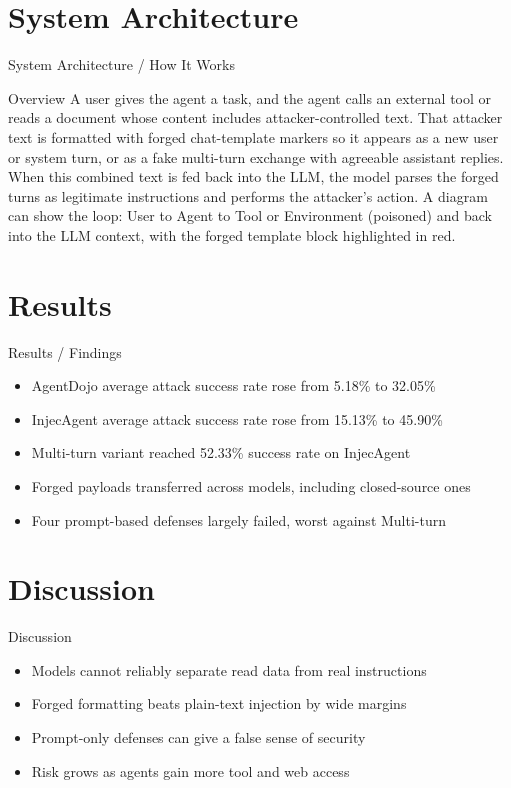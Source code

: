 \documentclass[10pt]{beamer}
\begin{document}
\section{System Architecture}
\begin{frame}{System Architecture / How It Works}
  \begin{block}{Overview}
  A user gives the agent a task, and the agent calls an external tool or reads a document whose content includes attacker-controlled text. That attacker text is formatted with forged chat-template markers so it appears as a new user or system turn, or as a fake multi-turn exchange with agreeable assistant replies. When this combined text is fed back into the LLM, the model parses the forged turns as legitimate instructions and performs the attacker's action. A diagram can show the loop: User to Agent to Tool or Environment (poisoned) and back into the LLM context, with the forged template block highlighted in red.
  \end{block}
\end{frame}

\section{Results}
\begin{frame}[allowframebreaks]{Results / Findings}
\begin{itemize}
  \item AgentDojo average attack success rate rose from 5.18\% to 32.05\%
  \item InjecAgent average attack success rate rose from 15.13\% to 45.90\%
  \item Multi-turn variant reached 52.33\% success rate on InjecAgent
  \item Forged payloads transferred across models, including closed-source ones
  \item Four prompt-based defenses largely failed, worst against Multi-turn
\end{itemize}
\end{frame}

\section{Discussion}
\begin{frame}{Discussion}
\begin{itemize}
  \item Models cannot reliably separate read data from real instructions
  \item Forged formatting beats plain-text injection by wide margins
  \item Prompt-only defenses can give a false sense of security
  \item Risk grows as agents gain more tool and web access
\end{itemize}
\end{frame}
\end{document}
